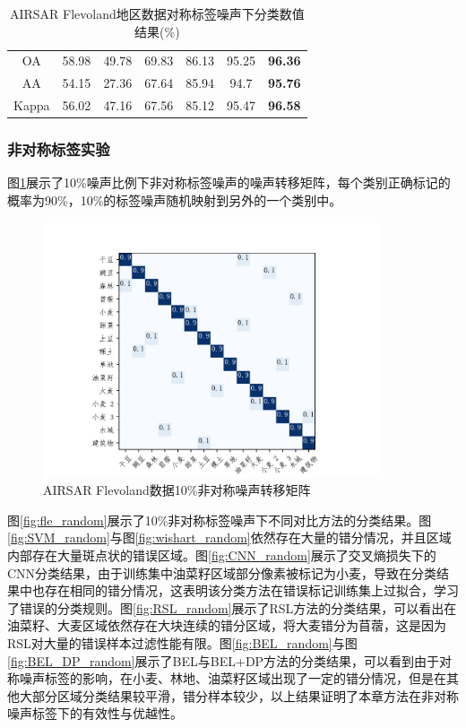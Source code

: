 \begin{table}[ht!]
\begin{tabular}{cccccccc}
    \midrule[0.75bp]
    \multicolumn{2}{c}{OA}    & 58.98 & 49.78 & 69.83   & 86.13 & 95.25          & \textbf{96.36}                  \\
    \multicolumn{2}{c}{AA}    & 54.15 & 27.36 & 67.64   & 85.94 & 94.7           & \textbf{95.76}                  \\
    \multicolumn{2}{c}{Kappa} & 56.02 & 47.16 & 67.56   & 85.12 & 95.47          & \textbf{96.58}                  \\
    \bottomrule[1.5bp]
  \end{tabular}
  \caption{AIRSAR Flevoland地区数据对称标签噪声下分类数值结果(\%)}
  \label{tab:fle_res_4}
\end{table}

\subsubsection{非对称标签实验}
图\ref{fig:fle_noise_random}展示了10\%噪声比例下非对称标签噪声的噪声转移矩阵，每个类别正确标记的概率为90\%，10\%的标签噪声随机映射到另外的一个类别中。
\begin{figure}[ht!]
  \centering
  \includegraphics[width=10.04cm]{pic/chapter4/fle/noise_random.pdf}
  \caption{AIRSAR Flevoland数据10\%非对称噪声转移矩阵}
  \label{fig:fle_noise_random}
\end{figure}

图\ref{fig:fle_random}展示了10\%非对称标签噪声下不同对比方法的分类结果。图\ref{fig:SVM_random}与图\ref{fig:wishart_random}依然存在大量的错分情况，并且区域内部存在大量斑点状的错误区域。图\ref{fig:CNN_random}展示了交叉熵损失下的CNN分类结果，由于训练集中油菜籽区域部分像素被标记为小麦，导致在分类结果中也存在相同的错分情况，这表明该分类方法在错误标记训练集上过拟合，学习了错误的分类规则。图\ref{fig:RSL_random}展示了RSL方法的分类结果，可以看出在油菜籽、大麦区域依然存在大块连续的错分区域，将大麦错分为苜蓿，这是因为RSL对大量的错误样本过滤性能有限。图\ref{fig:BEL_random}与图\ref{fig:BEL_DP_random}展示了BEL与BEL+DP方法的分类结果，可以看到由于对称噪声标签的影响，在小麦、林地、油菜籽区域出现了一定的错分情况，但是在其他大部分区域分类结果较平滑，错分样本较少，以上结果证明了本章方法在非对称噪声标签下的有效性与优越性。

